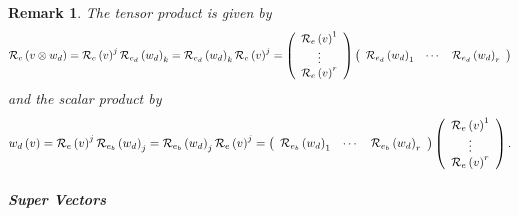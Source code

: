 \documentclass[aps,preprint]{revtex4}%
\newtheorem{remark}[theorem]{Remark}
\begin{document}
\begin{remark}
The tensor product is given by
\begin{equation}
\mathcal{R}_{e}\left(  v\otimes w_{d}\right)  =\mathcal{R}_{e}\left(
v\right)  ^{j}\mathcal{R}_{e_{d}}\left(  w_{d}\right)  _{k}=\mathcal{R}%
_{e_{d}}\left(  w_{d}\right)  _{k}\mathcal{R}_{e}\left(  v\right)
^{j}=\left(
\begin{array}
[c]{c}%
\mathcal{R}_{e}\left(  v\right)  ^{1}\\
\vdots\\
\mathcal{R}_{e}\left(  v\right)  ^{r}%
\end{array}
\right)  \left(
\begin{array}
[c]{ccc}%
\mathcal{R}_{e_{d}}\left(  w_{d}\right)  _{1} & \cdots & \mathcal{R}_{e_{d}%
}\left(  w_{d}\right)  _{r}%
\end{array}
\right)
\end{equation}
and the scalar product by
\begin{equation}
w_{d}\left(  v\right)  =\mathcal{R}_{e}\left(  v\right)  ^{j}\mathcal{R}%
_{e_{b}}\left(  w_{d}\right)  _{j}=\mathcal{R}_{e_{b}}\left(  w_{d}\right)
_{j}\mathcal{R}_{e}\left(  v\right)  ^{j}=\left(
\begin{array}
[c]{ccc}%
\mathcal{R}_{e_{b}}\left(  w_{d}\right)  _{1} & \cdots & \mathcal{R}_{e_{b}%
}\left(  w_{d}\right)  _{r}%
\end{array}
\right)  \left(
\begin{array}
[c]{c}%
\mathcal{R}_{e}\left(  v\right)  ^{1}\\
\vdots\\
\mathcal{R}_{e}\left(  v\right)  ^{r}%
\end{array}
\right)  .
\end{equation}

\end{remark}

\subparagraph{Super Vectors \label{Super Vectors}}
\end{document}
